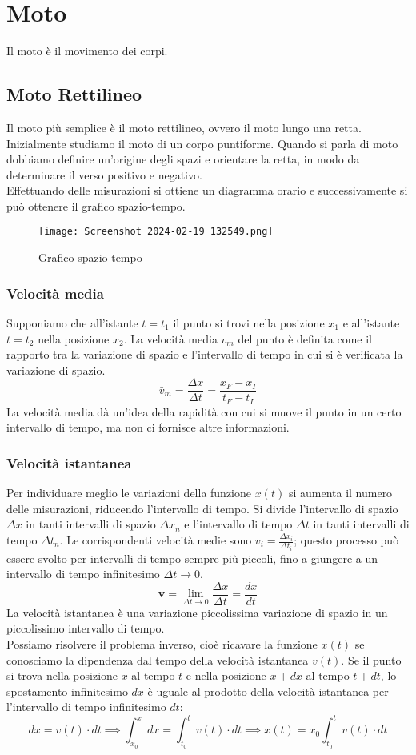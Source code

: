 \documentclass[../../main.tex]{subfiles}
\begin{document}
\newpage
\section{Moto}
Il moto è il movimento dei corpi.
\subsection{Moto Rettilineo}
Il moto più semplice è il moto rettilineo, ovvero il moto lungo una retta. Inizialmente studiamo il moto di un corpo puntiforme.
Quando si parla di moto dobbiamo definire un'origine degli spazi e orientare la retta, in modo da determinare il verso positivo e
negativo.\\
Effettuando delle misurazioni si ottiene un diagramma orario e successivamente si può ottenere il grafico spazio-tempo.\\
\begin{figure}[h!]
    \centering
    \texttt{[image: Screenshot 2024-02-19 132549.png]}
    \caption{Grafico spazio-tempo}
\end{figure}
\subsubsection{Velocità media}
Supponiamo che all'istante $t = t_1$ il punto si trovi nella posizione $x_1$ e all'istante $t = t_2$ nella posizione $x_2$.
La velocità media $v_m$ del punto è definita come il rapporto tra la variazione di spazio e l'intervallo di tempo in cui si è verificata la variazione di spazio.
\[
    \textbf{$\bar{v}_m$} = \frac{\Delta x}{\Delta t} = \frac{x_F - x_I}{t_F - t_I}
\]
La velocità media dà un'idea della rapidità con cui si muove il punto in un certo intervallo di tempo, ma non ci fornisce altre informazioni.
\subsubsection{Velocità istantanea}
Per individuare meglio le variazioni della funzione $x(t)$ si aumenta il numero delle misurazioni, riducendo l'intervallo di tempo.
Si divide l'intervallo di spazio $\Delta x$ in tanti intervalli di spazio $\Delta x_n$ e l'intervallo di tempo $\Delta t$ in tanti intervalli di tempo $\Delta t_n$. Le corrispondenti velocità medie sono $v_i = \frac{\Delta x_i}{\Delta t_i}$; questo processo può essere svolto per intervalli di tempo sempre più piccoli, fino a giungere a un intervallo di tempo infinitesimo $\Delta t \to 0$.
\[
    \textbf{v} = \lim_{\Delta t \to 0} \frac{\Delta x}{\Delta t} = \frac{dx}{dt}
\]
La velocità istantanea è una variazione piccolissima variazione di spazio in un piccolissimo intervallo di tempo.\\
Possiamo risolvere il problema inverso, cioè ricavare la funzione $x(t)$ se conosciamo la dipendenza dal tempo della velocità istantanea $v(t)$. Se il punto si trova nella posizione $x$ al tempo $t$ e nella posizione $x + dx$ al tempo $t + dt$, lo spostamento infinitesimo $dx$ è uguale al prodotto della velocità istantanea per l'intervallo di tempo infinitesimo $dt$:
\[
    dx = v(t) \cdot dt \implies \int_{x_0}^{x} dx = \int_{t_0}^{t} v(t) \cdot dt \implies x(t) = x_0 \int_{t_0}^{t} v(t) \cdot dt
\]
\end{document}
